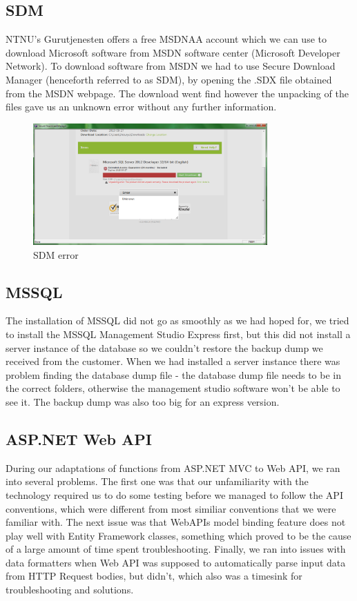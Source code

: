 \subsection{SDM}
NTNU's Gurutjenesten offers a free MSDNAA account which we can use to download Microsoft software from MSDN software center (Microsoft Developer Network). To download software from MSDN we had to use Secure Download Manager (henceforth referred to as SDM), by opening the .SDX file obtained from the MSDN webpage. The download went find however the unpacking of the files gave us an unknown error without any further information.
\begin{figure}[H]
\centering
\includegraphics[width=0.8\textwidth]{images/issue00.png}
\caption{SDM error}
\label{fig:SDM_error}
\end{figure}

\subsection{MSSQL}
The installation of MSSQL did not go as smoothly as we had hoped for, we tried to install the MSSQL Management Studio Express first, but this did not install a server instance of the database so we couldn't restore the backup dump we received from the customer. When we had installed a server instance there was problem finding the database dump file - the database dump file needs to be in the correct folders, otherwise the management studio software won't be able to see it. The backup dump was also too big for an express version.

\subsection{ASP.NET Web API}
\label{subsubsec:webapiissues}
During our adaptations of functions from ASP.NET MVC to Web API, we ran into several problems. The first one was that our unfamiliarity with the technology required us to do some testing before we managed to follow the API conventions, which were different from most similiar conventions that we were familiar with.
The next issue was that WebAPIs model binding feature does not play well with Entity Framework classes, something which proved to be the cause of a large amount of time spent troubleshooting.
Finally, we ran into issues with data formatters when Web API was supposed to automatically parse input data from HTTP Request bodies, but didn't, which also was a timesink for troubleshooting and solutions.

